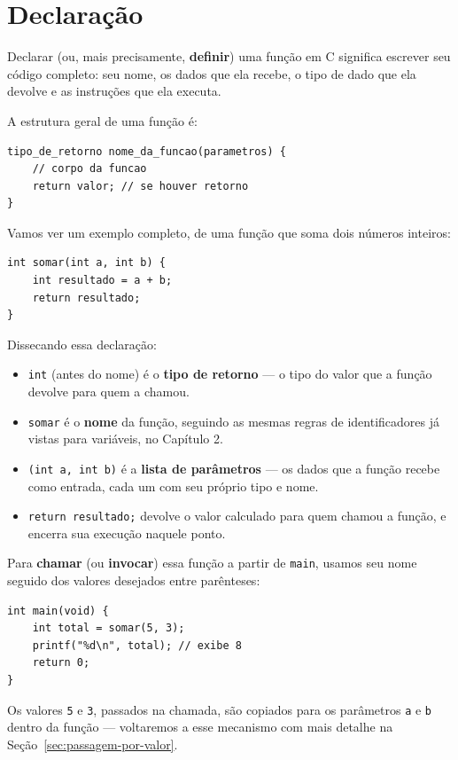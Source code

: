 \documentclass[12pt,a4paper,oneside]{extreport}
\begin{document}
\section{Declaração}

Declarar (ou, mais precisamente, \textbf{definir}) uma função em C significa escrever seu código completo: seu nome, os dados que ela recebe, o tipo de dado que ela devolve e as instruções que ela executa.

A estrutura geral de uma função é:

\begin{lstlisting}
tipo_de_retorno nome_da_funcao(parametros) {
    // corpo da funcao
    return valor; // se houver retorno
}
\end{lstlisting}

Vamos ver um exemplo completo, de uma função que soma dois números inteiros:

\begin{lstlisting}
int somar(int a, int b) {
    int resultado = a + b;
    return resultado;
}
\end{lstlisting}

Dissecando essa declaração:

\begin{itemize}
    \item \texttt{int} (antes do nome) é o \textbf{tipo de retorno} — o tipo do valor que a função devolve para quem a chamou.
    \item \texttt{somar} é o \textbf{nome} da função, seguindo as mesmas regras de identificadores já vistas para variáveis, no Capítulo 2.
    \item \texttt{(int a, int b)} é a \textbf{lista de parâmetros} — os dados que a função recebe como entrada, cada um com seu próprio tipo e nome.
    \item \texttt{return resultado;} devolve o valor calculado para quem chamou a função, e encerra sua execução naquele ponto.
\end{itemize}

Para \textbf{chamar} (ou \textbf{invocar}) essa função a partir de \texttt{main}, usamos seu nome seguido dos valores desejados entre parênteses:

\begin{lstlisting}
int main(void) {
    int total = somar(5, 3);
    printf("%d\n", total); // exibe 8
    return 0;
}
\end{lstlisting}

Os valores \texttt{5} e \texttt{3}, passados na chamada, são copiados para os parâmetros \texttt{a} e \texttt{b} dentro da função — voltaremos a esse mecanismo com mais detalhe na Seção~\ref{sec:passagem-por-valor}.
\end{document}
